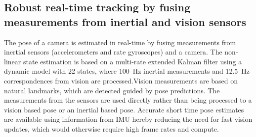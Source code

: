 
\subsection{Robust real-time tracking by fusing measurements from inertial and vision 	sensors} %

The pose of a camera is estimated in real-time by fusing measurements from inertial sensors (accelerometers and rate gyroscopes) and a camera. The non-linear state estimation is based on a multi-rate extended Kalman filter using a dynamic model with 22 states, where \SI{100}{\Hz} inertial measurements and \SI{12.5}{\Hz} correspondences from vision are processed.Vision measurements are based on natural landmarks, which are detected guided by pose predictions. The measurements from the sensors are used directly rather than being processed to a vision based pose or an inertial based pose. Accurate short time pose estimates are available using information from IMU hereby reducing the need for fast vision updates, which would otherwise require high frame rates and compute.

